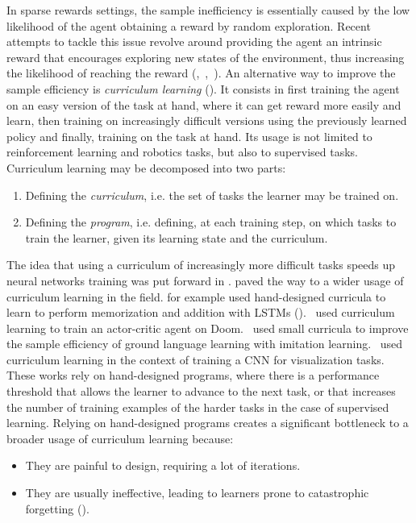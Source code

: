 \documentclass{article}
\begin{document}
In sparse rewards settings, the sample inefficiency is essentially caused by the low likelihood of the agent obtaining a reward by random exploration. Recent attempts to tackle this issue revolve around providing the agent an intrinsic reward that encourages exploring new states of the environment, thus increasing the likelihood of reaching the reward (\citep{ostrovski17a},~\citep{goyal2018transfer},~\citep{kim19a}). An alternative way to improve the sample efficiency is \textit{curriculum learning} (\citep{bengio2009curriculum}). It consists in first training the agent on an easy version of the task at hand, where it can get reward more easily and learn, then training on increasingly difficult versions using the previously learned policy and finally, training on the task at hand. Its usage is not limited to reinforcement learning and robotics tasks, but also to supervised tasks.
Curriculum learning may be decomposed into two parts:
\begin{enumerate}
\item
Defining the \textit{curriculum}, i.e. the set of tasks the learner may be trained on.
\item Defining the \textit{program}, i.e. defining, at each training step, on which tasks to train the learner, given its learning state and the curriculum.
\end{enumerate}

The idea that using a curriculum of increasingly more difficult tasks speeds up neural networks training was put forward in \citep{elman1993learning}. \citep{bengio2009curriculum} paved the way to a wider usage of curriculum learning in the field. \citep{zaremba2014learning} for example used hand-designed curricula to learn to perform memorization and addition with LSTMs (\citep{hochreiter1997long}).~\citep{wu2016training} used curriculum learning to train an actor-critic agent on Doom.~\citep{chevalier-boisvert2018babyai} used small curricula to improve the sample efficiency of ground language learning with imitation learning.~\citep{wein2018} used curriculum learning in the context of training a CNN for visualization tasks. These works rely on hand-designed programs, where there is a performance threshold that allows the learner to advance to the next task, or that increases the number of training examples of the harder tasks in the case of supervised learning. Relying on hand-designed programs creates a significant bottleneck to a broader usage of curriculum learning because:
\begin{itemize}
    \item They are painful to design, requiring a lot of iterations.
    \item They are usually ineffective, leading to learners prone to catastrophic forgetting (\citep{parisi2019continual}).
\end{itemize}
\end{document}
